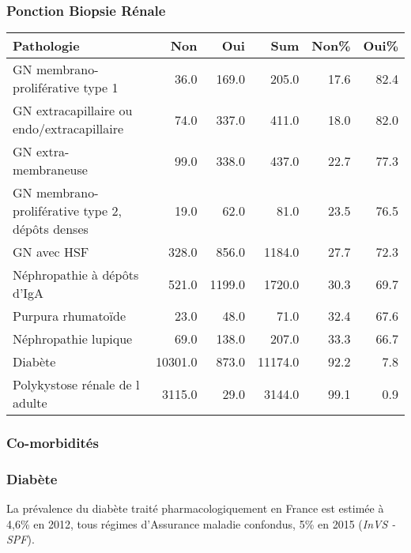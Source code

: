 \documentclass[11pt,a4paper]{article}\usepackage[]{graphicx}\usepackage[]{color}
\begin{document}
      \subsubsection{Ponction Biopsie Rénale}

\begin{table}[H]
\centering
\begin{tabular}{lrrrrr}
  \hline
Pathologie & Non & Oui & Sum & Non\% & Oui\% \\ 
  \hline
GN membrano-proliférative type 1 & 36.0 & 169.0 & 205.0 & 17.6 & 82.4 \\ 
  GN extracapillaire ou endo/extracapillaire & 74.0 & 337.0 & 411.0 & 18.0 & 82.0 \\ 
  GN extra-membraneuse & 99.0 & 338.0 & 437.0 & 22.7 & 77.3 \\ 
  GN membrano-proliférative type 2, dépôts denses & 19.0 & 62.0 & 81.0 & 23.5 & 76.5 \\ 
  GN avec HSF & 328.0 & 856.0 & 1184.0 & 27.7 & 72.3 \\ 
  Néphropathie à dépôts d'IgA & 521.0 & 1199.0 & 1720.0 & 30.3 & 69.7 \\ 
  Purpura rhumatoïde & 23.0 & 48.0 & 71.0 & 32.4 & 67.6 \\ 
  Néphropathie lupique & 69.0 & 138.0 & 207.0 & 33.3 & 66.7 \\ 
  Diabète & 10301.0 & 873.0 & 11174.0 & 92.2 & 7.8 \\ 
  Polykystose rénale de l adulte & 3115.0 & 29.0 & 3144.0 & 99.1 & 0.9 \\ 
   \hline
\end{tabular}
\end{table}


      \subsubsection{Co-morbidités}

\subsubsection*{Diabète}

La prévalence du diabète traité pharmacologiquement en France est estimée à 4,6\% en 2012, tous régimes d’Assurance maladie confondus, 5\% en 2015 (\textit{InVS - SPF}).
\end{document}
